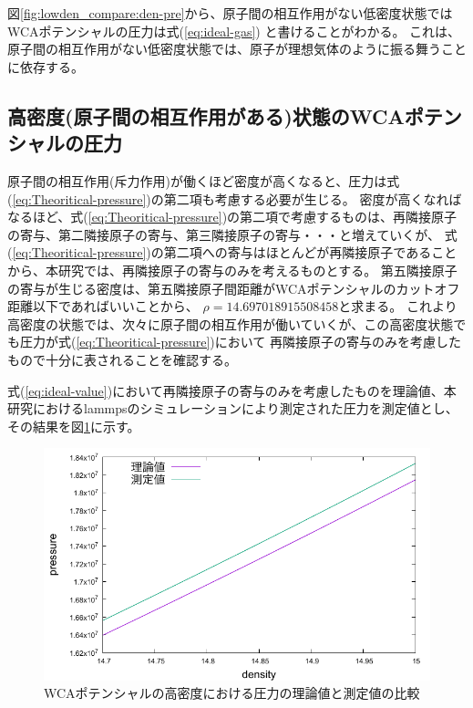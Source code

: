 \documentclass[titlepage]{jsreport}
\begin{document}
図\ref{fig:lowden_compare:den-pre}から、原子間の相互作用がない低密度状態ではWCAポテンシャルの圧力は式(\ref{eq:ideal-gas})
と書けることがわかる。
これは、原子間の相互作用がない低密度状態では、原子が理想気体のように振る舞うことに依存する。


\subsection{高密度(原子間の相互作用がある)状態のWCAポテンシャルの圧力}\label{results-sec:WCA-press-high-density}
原子間の相互作用(斥力作用)が働くほど密度が高くなると、圧力は式(\ref{eq:Theoritical-pressure})の第二項も考慮する必要が生じる。
密度が高くなればなるほど、式(\ref{eq:Theoritical-pressure})の第二項で考慮するものは、再隣接原子の寄与、第二隣接原子の寄与、第三隣接原子の寄与・・・と増えていくが、
式(\ref{eq:Theoritical-pressure})の第二項への寄与はほとんどが再隣接原子であることから、本研究では、再隣接原子の寄与のみを考えるものとする。
第五隣接原子の寄与が生じる密度は、第五隣接原子間距離がWCAポテンシャルのカットオフ距離以下であればいいことから、
$\rho=14.697018915508458$と求まる。
これより高密度の状態では、次々に原子間の相互作用が働いていくが、この高密度状態でも圧力が式(\ref{eq:Theoritical-pressure})において
再隣接原子の寄与のみを考慮したもので十分に表されることを確認する。

式(\ref{eq:ideal-value})において再隣接原子の寄与のみを考慮したものを理論値、本研究におけるlammpsのシミュレーションにより測定された圧力を測定値とし、その結果を図\ref{fig:highden_compare:den-pre}に示す。

\begin{figure}[htbp]
    \begin{center}
        \includegraphics[width=14cm]{fig/highden_compare:den-pre.pdf}
    \end{center}
    \caption{WCAポテンシャルの高密度における圧力の理論値と測定値の比較}
    \label{fig:highden_compare:den-pre}
\end{figure}
\end{document}
